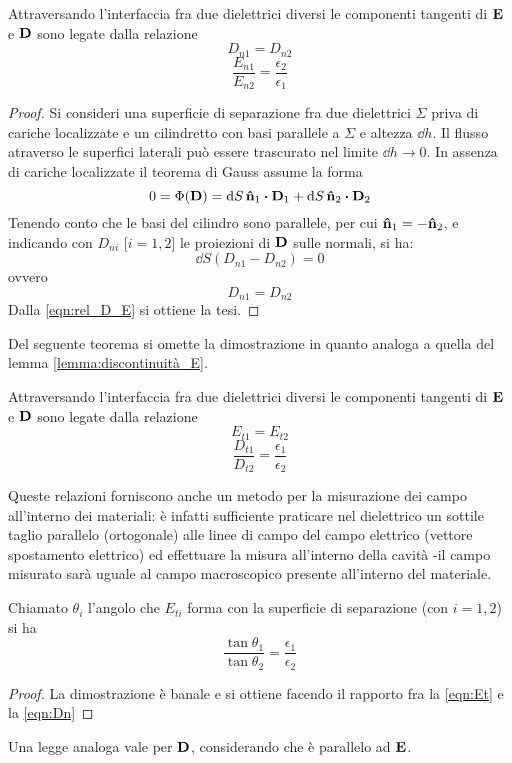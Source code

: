 \begin{thm}
    Attraversando l'interfaccia fra due dielettrici diversi le componenti tangenti di $\vb{E}$ e $\vb{D}$ sono legate dalla relazione
    \begin{equation}
        \label{eqn:Dn}
        D_{n1}=D_{n2}
    \end{equation}
    \begin{equation}
        \frac{E_{n1}}{E_{n2}}=\frac{\epsilon_2}{\epsilon_1}
    \end{equation}
\end{thm}
\begin{proof}
    Si consideri una superficie di separazione fra due dielettrici $\Sigma$ priva di cariche localizzate e un cilindretto con basi parallele a $\Sigma$ e altezza $\dd{h}$. Il flusso atraverso le superfici laterali può essere trascurato nel limite $\dd{h}\to0$. In assenza di cariche localizzate il teorema di Gauss assume la forma
    \[
        0=\Phi(\vb{D})=\dd{S}\vu{n}_1\vdot\vb{D}_1+\dd{S}\vu{n}_2\vdot\vb{D}_2
    \]
    Tenendo conto che le basi del cilindro sono parallele, per cui $\vu{n}_1=-\vu{n}_2$, e indicando con $D_{ni}$ [$i=1,2$] le proiezioni di $\vb{D}$ sulle normali, si ha:
    \[
        \dd{S}(D_{n1}-D_{n2})=0
    \]
    ovvero
    \[
        D_{n1}=D_{n2}
    \]
    Dalla \eqref{eqn:rel_D_E} si ottiene la tesi.
\end{proof}
Del seguente teorema si omette la dimostrazione in quanto analoga a quella del lemma \ref{lemma:discontinuità_E}.

\begin{thm}
    Attraversando l'interfaccia fra due dielettrici diversi le componenti tangenti di $\vb{E}$ e $\vb{D}$ sono legate dalla relazione
    \begin{equation}
        \label{eqn:Et}
        E_{t1}=E_{t2}
    \end{equation}
    \begin{equation}
        \frac{D_{t1}}{D_{t2}}=\frac{\epsilon_1}{\epsilon_2}
    \end{equation}
\end{thm}
Queste relazioni forniscono anche un metodo per la misurazione dei campo all'interno dei materiali:
è infatti sufficiente praticare nel dielettrico un sottile taglio parallelo (ortogonale) alle linee di
campo del campo elettrico (vettore spostamento elettrico) ed effettuare la misura all'interno della
cavità -il campo misurato sarà uguale al campo macroscopico presente all'interno del materiale.

\begin{thm}
    Chiamato $\theta_i$ l'angolo che $E_{ti}$ forma con la superficie di separazione (con $i=1,2$) si ha
    \[
        \frac{\tan\theta_1}{\tan\theta_2}=\frac{\epsilon_1}{\epsilon_2}
    \]
\end{thm}
\begin{proof}
    La dimostrazione è banale e si ottiene facendo il rapporto fra la \eqref{eqn:Et} e la \eqref{eqn:Dn}
\end{proof}
Una legge analoga vale per $\vb{D}$, considerando che è parallelo ad $\vb{E}$.
